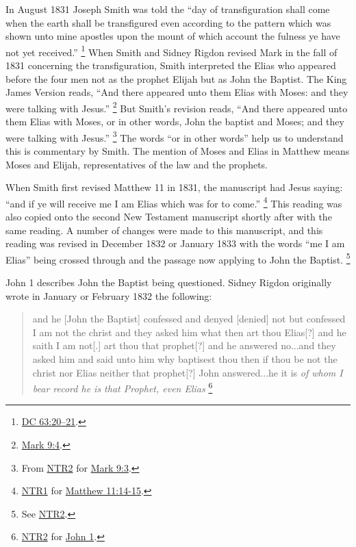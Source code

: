 		In August 1831 Joseph Smith was told the ``day of transfiguration shall come when the earth shall be transfigured even according to the pattern which was shown unto mine apostles upon the mount of which account the fulness ye have not yet received.''%
			\footnote{%
				\hyperref[DC63-20]{DC 63:20--21}.
				}
		When Smith and Sidney Rigdon revised Mark in the fall of 1831 concerning the transfiguration, Smith interpreted the Elias who appeared before the four men not as the prophet Elijah but as John the Baptist. The King James Version reads, ``And there appeared unto them Elias with Moses: and they were talking with Jesus.''%
			\footnote{%
				\hyperref[MARK-9-4]{Mark 9:4}.
				}
		But Smith's revision reads, ``And there appeared unto them Elias with Moses, or in other words, John the baptist and Moses; and they were talking with Jesus.''%
			\footnote{%
				From \hyperref[JST-NTR2]{NTR2} for \hyperref[MARK-9-3]{Mark 9:3}.
				}
		The words ``or in other words'' help us to understand this is commentary by Smith. The mention of Moses and Elias in Matthew means Moses and Elijah, representatives of the law and the prophets.

		When Smith first revised Matthew 11 in 1831, the manuscript had Jesus saying: ``and if ye will receive me I am Elias which was for to come.''%
			\footnote{%
				\hyperref[JST-NTR1]{NTR1} for \hyperref[MATTHEW-11-14]{Matthew 11:14-15}.
				}
		This reading was also copied onto the second New Testament manuscript shortly after with the same reading. A number of changes were made to this manuscript, and this reading was revised in December 1832 or January 1833 with the words ``me I am Elias'' being crossed through and the passage now applying to John the Baptist.%
			\footnote{%
				See \hyperref[JST-NTR2]{NTR2}.
				}

		John 1 describes John the Baptist being questioned. Sidney Rigdon originally wrote in January or February 1832 the following:

		\begin{quote}
			and he [John the Baptist] confessed and denyed [denied] not but confessed I am not the christ and they asked him what then art thou Elias[?] and he saith I am not[.] art thou that prophet[?] and he answered no...and they asked him and said unto him why baptisest thou then if thou be not the christ nor Elias neither that prophet[?] John answered...he it is \textit{of whom I bear record he is that Prophet, even Elias}%
				\footnote{%
					\hyperref[JST-NTR2]{NTR2} for \hyperref[JOHN-1]{John 1}.
					}
		\end{quote}

